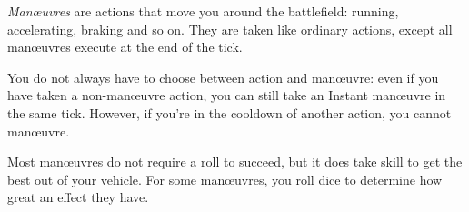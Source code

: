 
\emph{Man\oe{}uvres} are actions that move you around the battlefield: running, accelerating, braking and so on. They are taken like ordinary actions, except all man\oe{}uvres execute at the end of the tick.

You do not always have to choose between action and man\oe{}uvre: even if you have taken a non-man\oe{}uvre action, you can still take an Instant man\oe{}uvre in the same tick. However, if you're in the cooldown of another action, you cannot man\oe{}uvre.

Most man\oe{}uvres do not require a roll to succeed, but it does take skill to get the best out of your vehicle. For some man\oe{}uvres, you roll dice to determine how great an effect they have.
